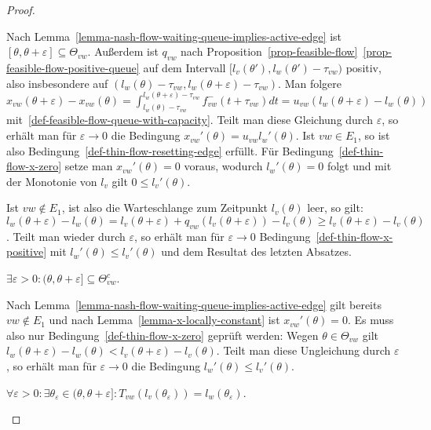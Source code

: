 \begin{proof}
\begin{description}[leftmargin=0cm, topsep=0cm, itemindent=0.5cm]
		Nach Lemma~\ref{lemma-nash-flow-waiting-queue-implies-active-edge} ist $[\theta,\theta+\varepsilon]\subseteq \Theta_{vw}$.
		Außerdem ist $q_{vw}$ nach Proposition~\ref{prop-feasible-flow}~\ref{prop-feasible-flow-positive-queue} auf dem Intervall $[ l_v(\theta') , l_w(\theta') - \tau_{vw} )$ positiv, also insbesondere auf $( l_w(\theta)-\tau_{vw} , l_w(\theta + \varepsilon) - \tau_{vw} )$.
		Man folgere $x_{vw}(\theta + \varepsilon) - x_{vw}(\theta) = \int_{l_w(\theta)-\tau_{vw}}^{l_w(\theta + \varepsilon)-\tau_{vw}} f_{vw}^-(t+\tau_{vw}) dt
		= u_{vw} (l_w(\theta + \varepsilon) - l_w(\theta))$ mit~\ref{def-feasible-flow-queue-with-capacity}.
		Teilt man diese Gleichung durch $\varepsilon$, so erhält man für $\varepsilon\rightarrow 0$ die Bedingung $x_{vw}'(\theta) = u_{vw} l_w'(\theta)$.
		Ist $vw\in E_1$, so ist also Bedingung~\ref{def-thin-flow-resetting-edge} erfüllt.
		Für Bedingung~\ref{def-thin-flow-x-zero} setze man $x_{vw}'(\theta)=0$ voraus, wodurch $l_w'(\theta)=0$ folgt und mit der Monotonie von $l_v$ gilt $0 \leq l_v'(\theta)$.
		
		Ist $vw\notin E_1$, ist also die Warteschlange zum Zeitpunkt $l_v(\theta)$ leer, so gilt: $l_w(\theta+\varepsilon) - l_w(\theta) = l_v(\theta + \varepsilon) + q_{vw}(l_v(\theta + \varepsilon)) - l_v(\theta) \geq l_v(\theta + \varepsilon) - l_v(\theta)$.
		Teilt man wieder durch $\varepsilon$, so erhält man für $\varepsilon \rightarrow 0$ Bedingung~\ref{def-thin-flow-x-positive} mit $l_w'(\theta) \leq l_v'(\theta)$ und dem Resultat des letzten Absatzes.
		
		\item[2. Fall:] $\exists \varepsilon > 0: (\theta, \theta + \varepsilon] \subseteq \Theta_{vw}^c$.
		
		Nach Lemma~\ref{lemma-nash-flow-waiting-queue-implies-active-edge} gilt bereits $vw\notin E_1$ und nach Lemma~\ref{lemma-x-locally-constant} ist $x_{vw}'(\theta) = 0$. 
		Es muss also nur Bedingung~\ref{def-thin-flow-x-zero} geprüft werden:
		Wegen $\theta\in\Theta_{vw}$ gilt $l_w(\theta + \varepsilon) - l_w(\theta) < l_v(\theta + \varepsilon) - l_v(\theta)$.
		Teilt man diese Ungleichung durch $\varepsilon$, so erhält man für $\varepsilon\rightarrow 0$ die Bedingung $l_w'(\theta)\leq l_v'(\theta)$.
		
		\item[3. Fall:] $\forall \varepsilon>0: \exists \theta_{\varepsilon}\in (\theta, \theta+\varepsilon]: T_{vw}(l_v(\theta_\varepsilon)) = l_w(\theta_\varepsilon)$.
		

\end{description}
\end{proof}
